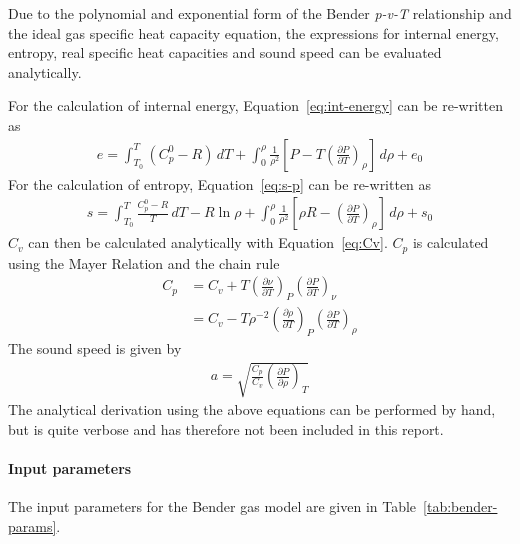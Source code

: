 Due to the polynomial and exponential form of the Bender \textit{p-v-T} relationship
and the ideal gas specific heat capacity equation,
the expressions for internal energy, entropy, real specific heat capacities and
sound speed can be evaluated analytically.

For the calculation of internal energy, Equation~\ref{eq:int-energy} can be
re-written as \cite{reynolds1979thermodynamic}
\begin{align}
e = \int_{T_0}^T \left(C_p^0 - R\right)\, dT
    + \int_0^{\rho}\frac{1}{\rho^2}\left[ P - T\left( \frac{\partial P}{\partial T} \right)_{\rho} \right]\, d\rho
    + e_0
\end{align}
For the calculation of entropy, Equation~\ref{eq:s-p} can be
re-written as \cite{reynolds1979thermodynamic}
\begin{align}
s = \int_{T_0}^T \frac{C_p^0 - R}{T}\, dT
    - R \ln{\rho}
    + \int_0^{\rho}\frac{1}{\rho^2}\left[ \rho R - \left( \frac{\partial P}{\partial T} \right)_{\rho} \right]\, d\rho
    + s_0
\end{align}
\(C_v\) can then be calculated analytically with Equation~\ref{eq:Cv}. \(C_p\) is
calculated using the Mayer Relation and the chain rule
\begin{align}
C_p &= C_v + T\left(\frac{\partial\nu}{\partial T}\right)_P\left(\frac{\partial P}{\partial T}\right)_{\nu}\\
    &= C_v - T \rho^{-2} \left(\frac{\partial\rho}{\partial T}\right)_P\left(\frac{\partial P}{\partial T}\right)_{\rho}
\end{align}
The sound speed is given by
\begin{align}
a = \sqrt{\frac{C_p}{C_v} \left(\frac{\partial P}{\partial \rho}\right)_T}
\end{align}
The analytical derivation using the above equations can be performed by hand, but
is quite verbose and has therefore not been included in this report.

\paragraph{Input parameters}
The input parameters for the Bender gas model are given in Table~\ref{tab:bender-params}.

